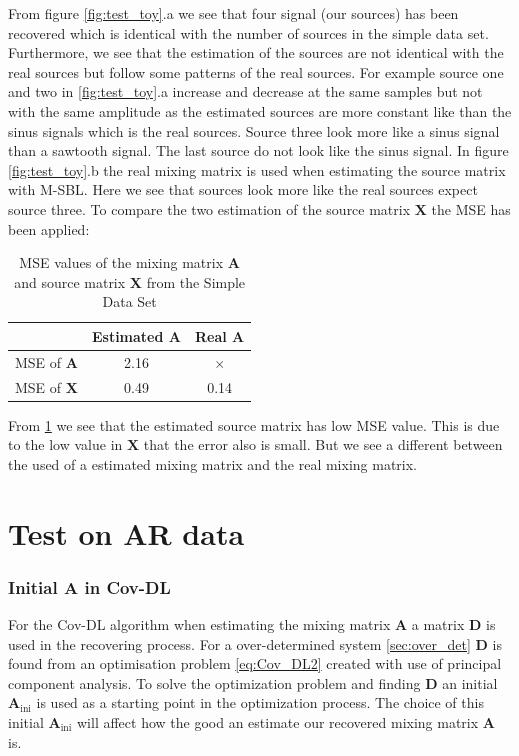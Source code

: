 \noindent
From figure \ref{fig:test_toy}.a we see that four signal (our sources) has been recovered which is identical with the number of sources in the simple data set. Furthermore, we see that the estimation of the sources are not identical with the real sources but follow some patterns of the real sources. For example source one and two in \ref{fig:test_toy}.a increase and decrease at the same samples but not with the same amplitude as the estimated sources are more constant like than the sinus signals which is the real sources. Source three look more like a sinus signal than a sawtooth signal. The last source do not look like the sinus signal.
In figure \ref{fig:test_toy}.b the real mixing matrix is used when estimating the source matrix with M-SBL. Here we see that sources look more like the real sources expect source three.
To compare the two estimation of the source matrix $\mathbf{X}$ the MSE has been applied:
\begin{table}[H]
\centering
\begin{tabular}{|c|c|c|}
\hline
         & Estimated $\mathbf{A}$ & Real $\mathbf{A}$ \\ \hline
MSE of $\mathbf{A}$ & 2.16 & $\times$ \\ 
\hline 
MSE of $\mathbf{X}$ & 0.49 & 0.14 \\ 
\hline
\end{tabular} 
\caption{MSE values of the mixing matrix $\mathbf{A}$ and source matrix $\mathbf{X}$ from the Simple Data Set}
\label{tab:test}
\end{table}
\noindent
From \ref{tab:test} we see that the estimated source matrix has low MSE value. This is due to the low value in $\mathbf{X}$ that the error also is small. But we see a different between the used of a estimated mixing matrix and the real mixing matrix.


\section{Test on AR data}
 

\subsubsection{Initial A in Cov-DL}
For the Cov-DL algorithm when estimating the mixing matrix $\mathbf{A}$ a matrix $\mathbf{D}$ is used in the recovering process. For a over-determined system \ref{sec:over_det} $\mathbf{D}$ is found from an optimisation problem \eqref{eq:Cov_DL2} created with use of principal component analysis. To solve the optimization problem and finding $\mathbf{D}$ an initial $\mathbf{A}_{\text{ini}}$ is used as a starting point in the optimization process. The choice of this initial $\mathbf{A}_{\text{ini}}$ will affect how the good an estimate our recovered mixing matrix $\mathbf{A}$ is.

